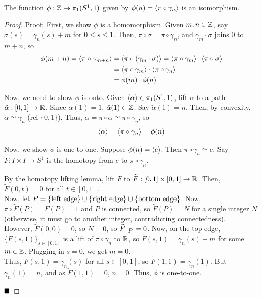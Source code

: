 \begin{theorem}
    The function $\phi : \Z \to \pi_1(S^1, 1)$ given by $\phi(n) = \brac{\pi \circ \gamma_n}$ is an isomorphism.
\end{theorem}
\begin{proof}{Proof:}
    First, we show $\phi$ is a homomorphism. Given $m, n \in \Z$, say $\sigma(s) = \gamma_n(s) + m$ for $0 \leq s \leq 1$. Then, $\pi \circ \sigma = \pi \circ \gamma_n$, and $\gamma_m \cdot \sigma$ joins $0$ to $m + n$, so 
    \begin{align*}
        \phi(m + n) = \brac{\pi \circ \gamma_{m + n}} &= \brac{\pi \circ (\gamma_m \cdot \sigma)} = \brac{\pi \circ \gamma_m} \cdot \brac{\pi \circ \sigma}\\ 
        &= \brac{\pi \circ \gamma_m} \cdot \brac{\pi \circ \gamma_n}\\
        &= \phi(m) \cdot \phi(n)
    \end{align*}

    Now, we need to show $\phi$ is onto. Given $\brac{\alpha} \in \pi_1(S^1, 1)$, lift $\alpha$ to a path $\tilde{\alpha} : [0, 1] \to \R$. Since $\alpha(1) = 1$, $\tilde{\alpha}(1) \in \Z$. Say $\tilde{\alpha}(1) = n$. Then, by convexity, $\tilde{\alpha} \simeq \gamma_n$ (rel $\{0, 1\}$). Thus, $\alpha = \pi \circ \tilde{\alpha} \simeq \pi \circ \gamma_n$, so
    \[ \brac{\alpha} = \brac{\pi \circ \gamma_n} = \phi(n) \]

    Now, we show $\phi$ is one-to-one. Suppose $\phi(n) = \brac{e}$. Then $\pi \circ \gamma_n \simeq e$. Say $F : I \times I \to S^1$ is the homotopy from $e$ to $\pi \circ \gamma_n$.

    By the homotopy lifting lemma, lift $F$ to $\widetilde{F} : [0, 1] \times [0, 1] \to \R$. Then, $\widetilde{F}(0, t) = 0$ for all $t \in [0, 1]$.\\

    Now, let $P = \{\tt{left edge}\} \cup \{\tt{right edge}\} \cup \{\tt{bottom edge}\}$. Now, $\pi \circ \widetilde{F}(P) = F(P) = 1$ and $P$ is connected, so $\widetilde{F}(P) = N$ for a single integer $N$ (otherwise, it must go to another integer, contradicting connectedness).\\

    However, $\widetilde{F}(0, 0) = 0$, so $N = 0$, so $\widetilde{F}\res{P} = 0$. Now, on the top edge, $\{\widetilde{F}(s, 1)\}_{s \in [0, 1]}$ is a lift of $\pi \circ \gamma_n$ to $\R$, so $\widetilde{F}(s, 1) = \gamma_n(s) + m$ for some $m \in \Z$. Plugging in $s = 0$, we get $m = 0$.\\

    Thus, $\widetilde{F}(s, 1) = \gamma_n(s)$ for all $s \in [0, 1]$, so $\widetilde{F}(1, 1) = \gamma_n(1)$. But $\gamma_n(1) = n$, and as $\widetilde{F}(1, 1) = 0$, $n = 0$. Thus, $\phi$ is one-to-one.

    $\qed$
\end{proof}
